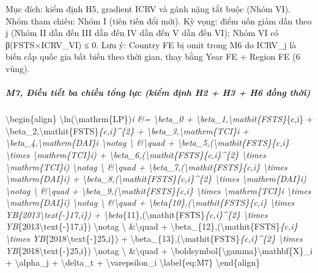 \documentclass[12pt,a4paper]{article}
\begin{document}
Mục đích: kiểm định H5, gradient ICRV và gánh nặng tắt buộc (Nhóm VI).
Nhóm tham chiếu: Nhóm I (tiên tiến đổi mới). Kỳ vọng: điểm uốn giảm dần
theo j (Nhóm II dẫn đến III dẫn đến IV dẫn đến V dẫn đến VI); Nhóm VI có
β(FSTS×ICRV\_VI) ≤ 0. Lưu ý: Country FE bị omit trong M6 do ICRV\_j là
biến cấp quốc gia bất biến theo thời gian, thay bằng Year FE + Region FE
(6 vùng).

\hypertarget{m7-ux111iux1ec1u-tiux1ebft-ba-chiux1ec1u-tux1ed5ng-lux1ef1c-kiux1ec3m-ux111ux1ecbnh-h2--h3--h6-ux111ux1ed3ng-thux1eddi}{%
\subparagraph{M7, Điều tiết ba chiều tổng lực (kiểm định H2 + H3 + H6
đồng
thời)}\label{m7-ux111iux1ec1u-tiux1ebft-ba-chiux1ec1u-tux1ed5ng-lux1ef1c-kiux1ec3m-ux111ux1ecbnh-h2--h3--h6-ux111ux1ed3ng-thux1eddi}}

\textbackslash begin\{align\}
\textbackslash ln(\textbackslash mathrm\{LP\})\emph{i \&=
\textbackslash beta\_0 +
\textbackslash beta\_1,\textbackslash mathit\{FSTS\}}\{c,i\} +
\textbackslash beta\_2,\textbackslash mathit\{FSTS\}\emph{\{c,i\}\^{}\{2\}
+ \textbackslash beta\_3,\textbackslash mathrm\{TCI\}\emph{i +
\textbackslash beta\_4,\textbackslash mathrm\{DAI\}\emph{i
\textbackslash notag \textbackslash{} \&\textbackslash quad +
\textbackslash beta\_5,(\textbackslash mathit\{FSTS\}}\{c,i\}
\textbackslash times \textbackslash mathrm\{TCI\}\emph{i) +
\textbackslash beta\_6,(\textbackslash mathit\{FSTS\}}\{c,i\}\^{}\{2\}
\textbackslash times \textbackslash mathrm\{TCI\}\emph{i)
\textbackslash notag \textbackslash{} \&\textbackslash quad +
\textbackslash beta\_7,(\textbackslash mathit\{FSTS\}}\{c,i\}
\textbackslash times \textbackslash mathrm\{DAI\}\emph{i) +
\textbackslash beta\_8,(\textbackslash mathit\{FSTS\}}\{c,i\}\^{}\{2\}
\textbackslash times \textbackslash mathrm\{DAI\}\emph{i)
\textbackslash notag \textbackslash{} \&\textbackslash quad +
\textbackslash beta\_9,(\textbackslash mathit\{FSTS\}}\{c,i\}
\textbackslash times \textbackslash mathrm\{TCI\}\emph{i
\textbackslash times \textbackslash mathrm\{DAI\}\emph{i)
\textbackslash notag \textbackslash{} \&\textbackslash quad +
\textbackslash beta}\{10\},(\textbackslash mathit\{FSTS\}}\{c,i\}
\textbackslash times YB}\{2013\textbackslash text\{-\}17,i\}) +
\textbackslash beta}\{11\},(\textbackslash mathit\{FSTS\}\emph{\{c,i\}\^{}\{2\}
\textbackslash times YB}\{2013\textbackslash text\{-\}17,i\})
\textbackslash notag \textbackslash{} \&\textbackslash quad +
\textbackslash beta\_\{12\},(\textbackslash mathit\{FSTS\}\emph{\{c,i\}
\textbackslash times YB}\{2018\textbackslash text\{-\}25,i\}) +
\textbackslash beta\_\{13\},(\textbackslash mathit\{FSTS\}\emph{\{c,i\}\^{}\{2\}
\textbackslash times YB}\{2018\textbackslash text\{-\}25,i\})
\textbackslash notag \textbackslash{} \&\textbackslash quad +
\textbackslash boldsymbol\{\textbackslash gamma\}\textquotesingle\textbackslash mathbf\{X\}\_i
+ \textbackslash alpha\_j + \textbackslash delta\_t +
\textbackslash varepsilon\_i \textbackslash label\{eq:M7\}
\textbackslash end\{align\}
\end{document}
